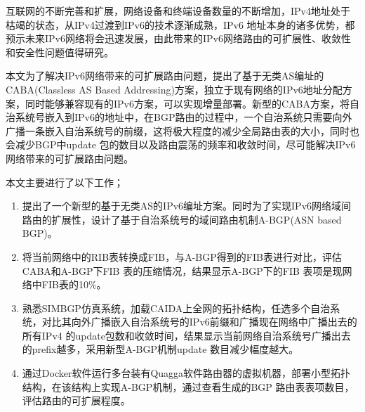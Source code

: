 \begin{cabstract}
  互联网的不断完善和扩展，网络设备和终端设备数量的不断增加，IPv4地址处于枯竭的状态，从IPv4过渡到IPv6的技术逐渐成熟，IPv6 地址本身的诸多优势，都预示未来IPv6网络将会迅速发展，由此带来的IPv6网络路由的可扩展性、收敛性和安全性问题值得研究。

  本文为了解决IPv6网络带来的可扩展路由问题，提出了基于无类AS编址的CABA(Classless AS Based Addressing)方案，独立于现有网络的IPv6地址分配方案，同时能够兼容现有的IPv6方案，可以实现增量部署。新型的CABA方案，将自治系统号嵌入到IPv6的地址中，在BGP路由的过程中，一个自治系统只需要向外广播一条嵌入自治系统号的前缀，这将极大程度的减少全局路由表的大小，同时也会减少BGP中update 包的数目以及路由震荡的频率和收敛时间，尽可能解决IPv6网络带来的可扩展路由问题。

  本文主要进行了以下工作；

  \begin{enumerate}
  \item 提出了一个新型的基于无类AS的IPv6编址方案。同时为了实现IPv6网络域间路由的扩展性，设计了基于自治系统号的域间路由机制A-BGP(ASN based BGP)。
  \item 将当前网络中的RIB表转换成FIB，与A-BGP得到的FIB表进行对比，评估CABA和A-BGP下FIB 表的压缩情况，结果显示A-BGP下的FIB 表项是现网络中FIB表的10\%。
  \item 熟悉SIMBGP仿真系统，加载CAIDA上全网的拓扑结构，任选多个自治系统，对比其向外广播嵌入自治系统号的IPv6前缀和广播现在网络中广播出去的所有IPv4 的update包数和收敛时间，结果显示当前网络自治系统号广播出去的prefix越多，采用新型A-BGP机制update 数目减少幅度越大。
  \item 通过Docker软件运行多台装有Quagga软件路由器的虚拟机器，部署小型拓扑结构，在该结构上实现A-BGP机制，通过查看生成的BGP 路由表表项数目，评估路由的可扩展程度。
  \end{enumerate}
\end{cabstract}


